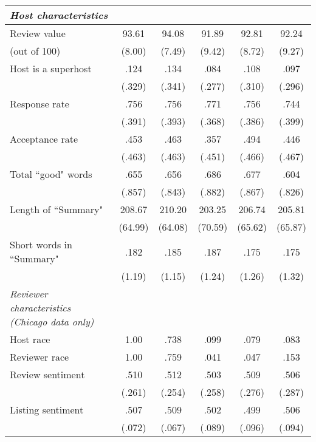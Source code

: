{\begin{longtable}{l*{5}{c}}
\textit{Host characteristics} \\
\hline
Review value         &      93.61	&      94.08	 	&      91.89		&    92.81	 & 		92.24\\
(out of 100)                    &     (8.00)         &     (7.49)         &     (9.42)         &     (8.72) 	&	 (9.27)         \\
[1em]
Host is a superhost        &      .124		&      .134&      .084 &      .108  	& 	.097\\
               & (.329)     &     (.341)         &     (.277)         &     (.310)         &     (.296)         \\
[1em]
Response rate         &       .756		&       .756		&      .771         &      .756  	& 	.744\\
                    &     (.391)         &     (.393)         &     (.368)         &     (.386)         &		(.399)\\
[1em]
Acceptance rate           &      .453&      .463&       .357         &      .494    &	.446     \\
                    &     (.463)         &     (.463)         &     (.451)         &     (.466)         &		(.467)\\
[1em]
Total ``good" words           &      .655&      .656&       .686         &      .677    &	.604     \\
                    &     (.857)         &     (.843)         &     (.882)         &     (.867)         &		(.826)\\
[1em]
Length of ``Summary"           &      208.67 	&      210.20	&       203.25         &      206.74    &	205.81     \\
                    &       (64.99)  &    (64.08)         &     (70.59)         &     (65.62)         &     (65.87) \\
[1em]
Short words in ``Summary"           &      .182		&      .185		&       .187         &      .175    &	.175     \\
                    &     (1.19)         &     (1.15)         &     (1.24)         &     (1.26)         &		(1.32)\\                    
                    
\textit{Reviewer characteristics (Chicago data only) } \\
\hline
Host race            &      1.00 &      .738&       .099         &      .079    &	.083     \\
[1em]
Reviewer race            &      1.00		&      .759	&       .041         &      .047    &	.153     \\
[1em]
Review sentiment            &      .510	&      .512&       .503         &      .509    &	.506     \\
                    &     (.261)         &     (.254)         &     (.258)         &     (.276)         &		(.287)\\
[1em]
Listing sentiment            &      .507&      .509&       .502         &      .499    &	.506     \\
                    &     (.072)         &     (.067)         &     (.089)         &     (.096)         &		(.094)\\


\end{longtable}}
